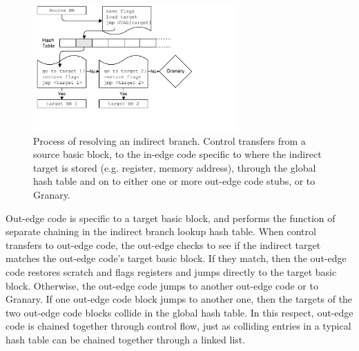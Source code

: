 \documentclass[preprint]{sigplanconf}
\begin{document}
\begin{figure}[t!]
\hspace{4em}\includegraphics[height=13em,clip=true,trim=0 5em 10em 0]{diagrams/ibl.pdf}
\caption{\label{fig:ibl}Process of resolving an indirect branch. Control transfers from a source basic block, to the in-edge code specific to where the indirect target is stored (e.g. register, memory address), through the global hash table and on to either one or more out-edge code stubs, or to Granary.}
\end{figure}

Out-edge code is specific to a target basic block, and performs the function of separate chaining in the indirect branch lookup hash table. When control transfers to out-edge code, the out-edge checks to see if the indirect target matches the out-edge code's target basic block. If they match, then the out-edge code restores scratch and flags registers and jumps directly to the target basic block. Otherwise, the out-edge code jumps to another out-edge code or to Granary. If one out-edge code block jumps to another one, then the targets of the two out-edge code blocks collide in the global hash table. In this respect, out-edge code is chained together through control flow, just as colliding entries in a typical hash table can be chained together through a linked list.
\end{document}
